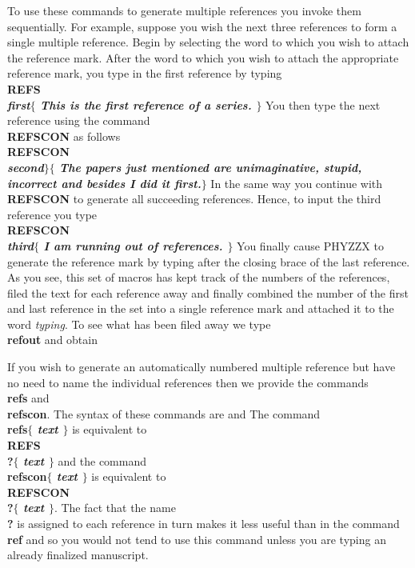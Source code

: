 To use these commands to generate multiple references you invoke
them sequentially.
For example, suppose you wish the next three references to form
a single multiple reference.
Begin by selecting the word to which you wish to attach the
reference mark.
After the word to which you wish to attach the appropriate
reference mark, you type in the first reference
\REFS{}
\REFSCON{}
\REFSCON{}
by typing \nextline
{\bf \\REFS\\{\it first}\bf $\{$ \it
This is the first reference of a series. \bf $\}$} \nextline
You then type the next reference using the command {\bf \\REFSCON}
as follows \nextline
{\bf \\REFSCON\\{\it second}\bf $\}\{$ \it
The papers just mentioned are unimaginative,
stupid, incorrect and besides I did it first.\bf $\}$} \nextline
In the same way you continue with {\bf \\REFSCON} to generate
all succeeding references.
Hence, to input the third reference you type \nextline
{\bf \\REFSCON\\{\it third}\bf $\{$ \it
I am running out of references. \bf $\}$ } \nextline
You finally cause PHYZZX to generate the reference mark by
typing
{}
after the closing brace of the last reference.
As you see, this set of macros has kept track of the numbers
of the references, filed the text for
each reference away and finally combined the number of the first
and last reference in the set into a single reference mark and
attached it to the word {\it typing}.
To see what has been filed away we type {\bf \\refout}
and obtain
 
 
If you wish to generate an automatically numbered multiple
reference but have no need to name the individual references
then we provide the commands {\bf \\refs} and {\bf \\refscon}.
The syntax of these commands are
and
The command {\bf \\refs$\{$ \it text \bf $\}$} is equivalent
to {\bf \\REFS\\?$\{$ \it text \bf $\}$ }
and the command {\bf \\refscon$\{$ \it text \bf $\}$}
is equivalent to {\bf \\REFSCON\\?$\{$ \it text \bf $\}$}.
The fact that the name {\bf \\?} is assigned
to each reference in turn makes it less useful than in the command
{\bf \\ref} and so you would not tend to use this command unless
you are typing an already finalized manuscript.
 
